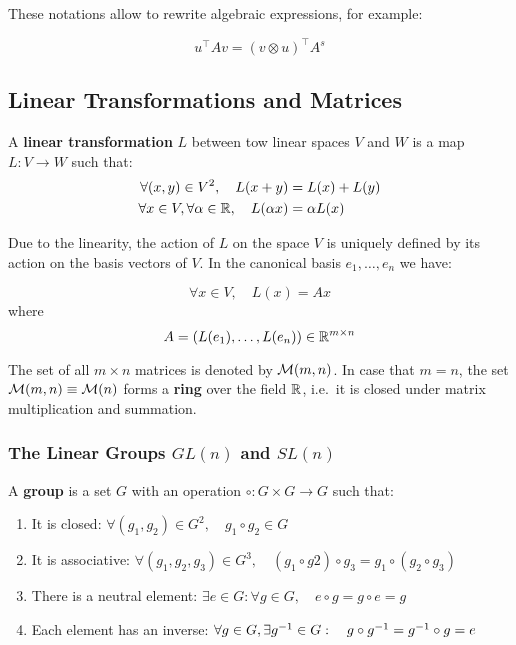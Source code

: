 These notations allow to rewrite algebraic expressions, for example:

\[u^{\top} A v = {( v \otimes u )}^{\top} A^s\]

\subsection{Linear Transformations and Matrices}%
\label{sub:linear_transformations_and_matrices}

A \textbf{linear transformation} $L$ between tow linear spaces
$V$ and $W$ is a map $L : V \rightarrow W$ such that:
\begin{align*}
	\forall (x,y) \in V^2 ,\quad L(x+y) &= L(x) + L(y) \\
	\forall x \in V, \forall \alpha \in \mathbb{R},\quad L(\alpha x) &= \alpha L(x)
\end{align*}

Due to the linearity, the action of $L$ on the space $V$
is uniquely defined by its action on the basis vectors of $V$.
In the canonical basis ${e_1, \ldots, e_n}$ we have:

\[\forall x \in V, \quad L(x) = Ax\]
where
\[A = (L(e_1), \ldots, L(e_n)) \in \mathbb{R}^{m \times n}\]

The set of all $m \times n$ matrices is denoted by $\mathcal{M}(m,n)$.
In case that $m = n$, the set $\mathcal{M}(m,n) \equiv \mathcal{M}(n)$
forms a \textbf{ring} over the field $\mathbb{R}$, i.e.\ it is closed
under matrix multiplication and summation.


\subsubsection{The Linear Groups $GL(n)$ and $SL(n)$}%
\label{ssub:the_linear_groups_gl_n_and_sl_n_}

A \textbf{group} is a set $G$ with an operation
$\circ : G \times G \rightarrow G$ such that:
\begin{enumerate}
	\item It is closed:
		$\forall (g_1, g_2) \in G^2, \quad g_1 \circ g_2 \in G$
	\item It is associative:
		$\forall (g_1, g_2, g_3) \in G^3, \quad
		(g_1 \circ g2) \circ g_3 = g_1 \circ (g_2 \circ g_3)$
	\item There is a neutral element:
		$\exists e \in G: \forall g \in G, \quad
		e \circ g = g \circ e = g$
	\item Each element has an inverse:
		$\forall g \in G, \exists g^{-1} \in G : \quad
		g \circ g^{-1} = g^{-1} \circ g = e$
\end{enumerate}

